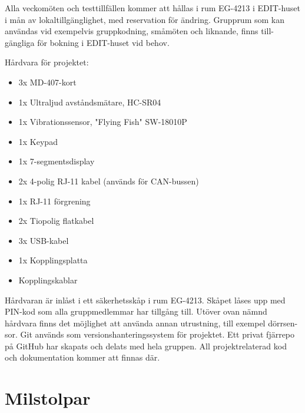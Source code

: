 \documentclass[a4paper]{article}
\begin{document}
Alla veckomöten och testtillfällen kommer att hållas i rum EG-4213 i EDIT-huset i mån av lokaltillgänglighet, med reservation för ändring. Grupprum som kan användas vid exempelvis gruppkodning, småmöten och liknande, finns till-gängliga för bokning i EDIT-huset vid behov.

Hårdvara för projektet:
\begin{itemize}
	\item 3x MD-407-kort
	\item 1x Ultraljud avståndsmätare, HC-SR04
	\item 1x Vibrationssensor, "Flying Fish" SW-18010P
	\item 1x Keypad
	\item 1x 7-segmentsdisplay
	\item 2x 4-polig RJ-11 kabel (används för CAN-bussen)
	\item 1x RJ-11 förgrening
	\item 2x Tiopolig flatkabel
	\item 3x USB-kabel
	\item 1x Kopplingsplatta
	\item Kopplingskablar
\end{itemize}

Hårdvaran är inlåst i ett säkerhetsskåp i rum EG-4213. Skåpet låses upp med PIN-kod som alla gruppmedlemmar har tillgång till. Utöver ovan nämnd hårdvara finns det möjlighet att använda annan utrustning, till exempel dörrsen-sor.
Git används som versionshanteringssystem för projektet. Ett privat fjärrepo på GitHub har skapats och delats med hela gruppen. All projektrelaterad kod och dokumentation kommer att finnas där.

\section{Milstolpar}
\label{sec:milstolpar}
\end{document}

